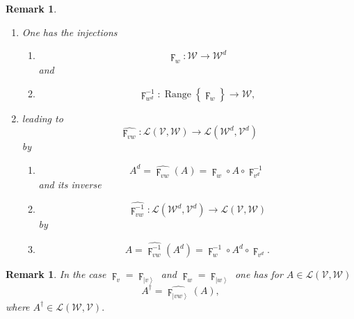 \documentclass[aps,preprint]{revtex4}%
\newtheorem{remark}[theorem]{Remark}
\begin{document}
\begin{remark}
\begin{enumerate}
\begin{enumerate}
\end{enumerate}

\item One has the injections

\begin{enumerate}
\item
\begin{equation}
\digamma_{w}:\mathcal{W}\rightarrow\mathcal{W}^{d}%
\end{equation}
and

\item
\begin{equation}
\digamma_{w^{d}}^{-1}:\operatorname*{Range}\left\{  \digamma_{w}\right\}
\rightarrow\mathcal{W},
\end{equation}

\end{enumerate}

\item leading to
\begin{equation}
\widehat{\digamma_{vw}}:\mathcal{L}\left(  \mathcal{V},\mathcal{W}\right)
\rightarrow\mathcal{L}\left(  \mathcal{W}^{d},\mathcal{V}^{d}\right)
\end{equation}
by

\begin{enumerate}
\item
\begin{equation}
A^{d}=\widehat{\digamma_{vw}}\left(  A\right)  =\digamma_{w}\circ
A\circ\digamma_{v^{d}}^{-1}%
\end{equation}
and its inverse

\item
\begin{equation}
\widehat{\digamma_{vw}^{-1}}:\mathcal{L}\left(  \mathcal{W}^{d},\mathcal{V}%
^{d}\right)  \rightarrow\mathcal{L}\left(  \mathcal{V},\mathcal{W}\right)
\end{equation}
by

\item
\begin{equation}
A=\widehat{\digamma_{vw}^{-1}}\left(  A^{d}\right)  =\digamma_{w}^{-1}\circ
A^{d}\circ\digamma_{v^{d}}.
\end{equation}

\end{enumerate}
\end{enumerate}
\end{remark}

\begin{remark}
In the case $\digamma_{v}=\digamma_{\left\vert v\right\rangle }$ and
$\digamma_{w}=\digamma_{\left\vert w\right\rangle }$ one has for
$A\in\mathcal{L}\left(  \mathcal{V},\mathcal{W}\right)  $
\begin{equation}
A^{\dagger}=\widehat{\digamma_{\left\vert vw\right\rangle }}\left(  A\right)
,
\end{equation}
where $A^{\dagger}\in\mathcal{L}\left(  \mathcal{W},\mathcal{V}\right)  .$
\end{remark}
\end{document}
